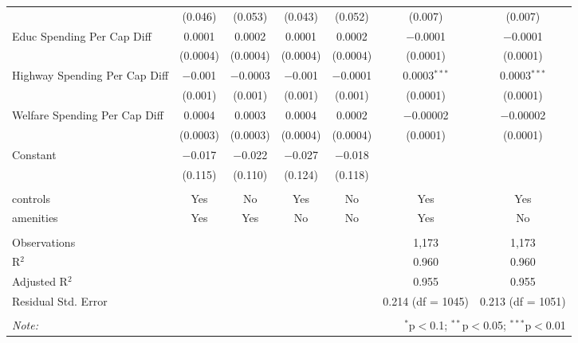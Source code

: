 \begin{table}[!htbp]
\begin{tabular}{@{\extracolsep{5pt}}lcccccc}
  & (0.046) & (0.053) & (0.043) & (0.052) & (0.007) & (0.007) \\ 
  Educ Spending Per Cap Diff & 0.0001 & 0.0002 & 0.0001 & 0.0002 & $-$0.0001 & $-$0.0001 \\ 
  & (0.0004) & (0.0004) & (0.0004) & (0.0004) & (0.0001) & (0.0001) \\ 
  Highway Spending Per Cap Diff & $-$0.001 & $-$0.0003 & $-$0.001 & $-$0.0001 & 0.0003$^{***}$ & 0.0003$^{***}$ \\ 
  & (0.001) & (0.001) & (0.001) & (0.001) & (0.0001) & (0.0001) \\ 
  Welfare Spending Per Cap Diff & 0.0004 & 0.0003 & 0.0004 & 0.0002 & $-$0.00002 & $-$0.00002 \\ 
  & (0.0003) & (0.0003) & (0.0004) & (0.0004) & (0.0001) & (0.0001) \\ 
  Constant & $-$0.017 & $-$0.022 & $-$0.027 & $-$0.018 &  &  \\ 
  & (0.115) & (0.110) & (0.124) & (0.118) &  &  \\ 
 \hline \\[-1.8ex] 
controls & Yes & No & Yes & No & Yes & Yes \\ 
amenities & Yes & Yes & No & No & Yes & No \\ 
\hline \\[-1.8ex] 
Observations &  &  &  &  & 1,173 & 1,173 \\ 
R$^{2}$ &  &  &  &  & 0.960 & 0.960 \\ 
Adjusted R$^{2}$ &  &  &  &  & 0.955 & 0.955 \\ 
Residual Std. Error &  &  &  &  & 0.214 (df = 1045) & 0.213 (df = 1051) \\ 
\hline 
\hline \\[-1.8ex] 
\textit{Note:}  & \multicolumn{6}{r}{$^{*}$p$<$0.1; $^{**}$p$<$0.05; $^{***}$p$<$0.01} \\ 
\end{tabular} 
\end{table} 
